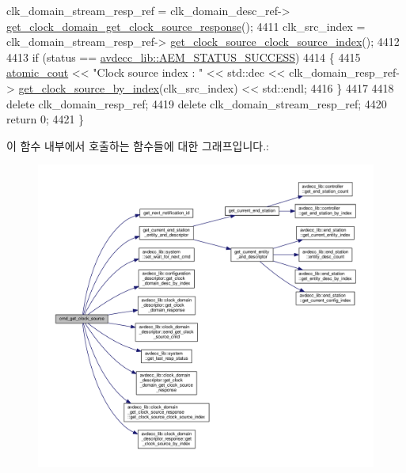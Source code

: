 \begin{DoxyCode}
      clk\_domain\_stream\_resp\_ref = clk\_domain\_desc\_ref->
      \hyperlink{classavdecc__lib_1_1clock__domain__descriptor_a2ed737d8c0ba02deff349ba0d2157719}{get\_clock\_domain\_get\_clock\_source\_response}();
4411     clk\_src\_index = clk\_domain\_stream\_resp\_ref->
      \hyperlink{classavdecc__lib_1_1clock__domain__get__clock__source__response_a99d78d352ef63d5dbe979572938f98f7}{get\_clock\_source\_clock\_source\_index}();
4412 
4413     \textcolor{keywordflow}{if} (status == \hyperlink{namespaceavdecc__lib_affd436edb2cecd20cfd784a84f852b2bac947077909cb590b84f4b5db413080e0}{avdecc\_lib::AEM\_STATUS\_SUCCESS})
4414     \{
4415         \hyperlink{cmd__line_8h_a0bc38ccc65c79ba06c6fcd7b4bf554c3}{atomic\_cout} << \textcolor{stringliteral}{"Clock source index : "} << std::dec << clk\_domain\_resp\_ref->
      \hyperlink{classavdecc__lib_1_1clock__domain__descriptor__response_a1ea52be8698ee7b8efd364de5b30a82f}{get\_clock\_source\_by\_index}(clk\_src\_index) << std::endl;
4416     \}
4417 
4418     \textcolor{keyword}{delete} clk\_domain\_resp\_ref;
4419     \textcolor{keyword}{delete} clk\_domain\_stream\_resp\_ref;
4420     \textcolor{keywordflow}{return} 0;
4421 \}
\end{DoxyCode}


이 함수 내부에서 호출하는 함수들에 대한 그래프입니다.\+:
\nopagebreak
\begin{figure}[H]
\begin{center}
\leavevmode
\includegraphics[width=350pt]{classcmd__line_ae80c5fbd5e976997854ba7de5344d2ef_cgraph}
\end{center}
\end{figure}




